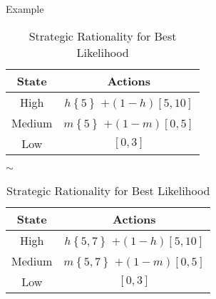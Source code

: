 \documentclass[usenames,dvipsnames,aspectratio=169,11pt, envcountsect]{beamer}
\begin{document}
\begin{frame}{Example}
	\begin{table}[H]
		\centering
		\begin{minipage}{0.45\textwidth}
			\centering
			\begin{tabular}{c | c}
				State                          & Actions                                                                                       \\
				\hline
				{\color{bleudefrance} High}    & {\color{bleudefrance}\( h \left\{ 5 \right\} \) } \(+ \left(1-h \right) \left[5,10 \right] \) \\
				{\color{bleudefrance} Medium } & {\color{bleudefrance}\( m \left\{ 5 \right\} \) } \(+ \left(1-m \right) \left[0,5 \right] \)  \\
				Low                            & \( \left[0,3 \right] \)                                                                       \\
			\end{tabular}
			\vspace{0.5cm} %
		\end{minipage}\hspace{0.25cm} %
		\( \sim \) %
		\hspace{0.25cm}
		\begin{minipage}{0.45\textwidth}
			\centering
			\begin{tabular}{c | c}
				State                          & Actions                                                                                         \\
				\hline
				{\color{bleudefrance} High}    & {\color{bleudefrance}\( h \left\{ 5,7 \right\} \) } \(+ \left(1-h \right) \left[5,10 \right] \) \\
				{\color{bleudefrance} Medium } & {\color{bleudefrance}\( m \left\{ 5,7 \right\} \) } \(+ \left(1-m \right) \left[0,5 \right] \)  \\
				Low                            & \( \left[0,3 \right] \)                                                                         \\
			\end{tabular}
			\vspace{0.5cm} %
		\end{minipage}
		\caption{Strategic Rationality for Best Likelihood} %
		\label{tab:srbl}
	\end{table}
\end{frame}
\end{document}
